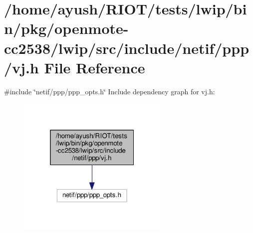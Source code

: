 \hypertarget{openmote-cc2538_2lwip_2src_2include_2netif_2ppp_2vj_8h}{}\section{/home/ayush/\+R\+I\+O\+T/tests/lwip/bin/pkg/openmote-\/cc2538/lwip/src/include/netif/ppp/vj.h File Reference}
\label{openmote-cc2538_2lwip_2src_2include_2netif_2ppp_2vj_8h}
{\ttfamily \#include \char`\"{}netif/ppp/ppp\+\_\+opts.\+h\char`\"{}}\newline
Include dependency graph for vj.\+h\+:
\nopagebreak
\begin{figure}[H]
\begin{center}
\leavevmode
\includegraphics[width=205pt]{openmote-cc2538_2lwip_2src_2include_2netif_2ppp_2vj_8h__incl}
\end{center}
\end{figure}
